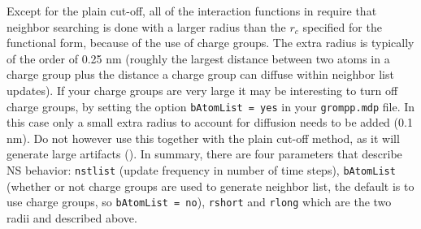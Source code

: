 Except for the plain cut-off,
all of the interaction functions in 
require that neighbor searching is done with a larger radius than the $r_c$
specified for the functional form, because of the use of charge groups.
The extra radius is typically of the order of 0.25 nm (roughly the 
largest distance between two atoms in a charge group plus the distance a 
charge group can diffuse within neighbor list updates).
If your charge groups are very large it may be interesting to turn off charge
groups, by setting the option 
{\tt bAtomList = yes} in your {\tt grompp.mdp} file.
In this case only a small extra radius to account for diffusion needs to be 
added (0.1 nm). Do not however use this together with the plain cut-off
method, as it will generate large artifacts ().
In summary, there are four parameters that describe NS behavior:
{\tt nstlist} (update frequency in number of time steps),
{\tt bAtomList} (whether or not charge groups are used to generate neighbor list, the default is to use charge groups, so {\tt bAtomList = no}),
{\tt rshort} and {\tt rlong} which are the two radii {\rs} and {\rl}
described above.

